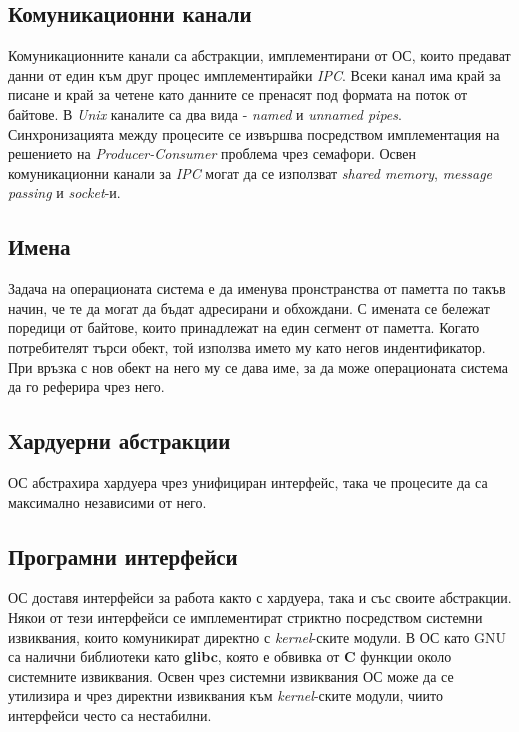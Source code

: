 \documentclass[fleqn,12pt]{article}
\begin{document}
\subsection{Комуникационни канали}

Комуникационните канали са абстракции, имплементирани от ОС, които предават данни от един към друг процес имплементирайки \textit{IPC}.
Всеки канал има край за писане и край за четене като данните се пренасят под формата на поток от байтове.
В \textit{Unix} каналите са два вида - \textit{named}  и \textit{unnamed pipes}.
Синхронизацията между процесите се извършва посредством имплементация на решението на \textit{Producer-Consumer} проблема чрез семафори.
Освен комуникационни канали за \textit{IPC} могат да се използват \textit{shared memory}, \textit{message passing} и \textit{socket}-и.

\subsection{Имена}

Задача на операционата система е да именува пронстранства от паметта по такъв начин, че те да могат да бъдат адресирани и обхождани.
С имената се бележат поредици от байтове, които принадлежат на един сегмент от паметта.
Когато потребителят търси обект, той използва името му като негов индентификатор.
При връзка с нов обект на него му се дава име, за да може операционата система да го реферира чрез него.

\subsection{Хардуерни абстракции}

ОС абстрахира хардуера чрез унифициран интерфейс, така че процесите да са максимално независими от него.

\subsection{Програмни интерфейси}

ОС доставя интерфейси за работа както с хардуера, така и със своите абстракции.
Някои от тези интерфейси се имплементират стриктно посредством системни извиквания, които комуникират директно с \textit{kernel}-ските модули.
В ОС като GNU са налични библиотеки като \textbf{glibc}, която е обвивка от \textbf{C} функции около системните извиквания.
Освен чрез системни извиквания ОС може да се утилизира и чрез директни извиквания към \textit{kernel}-ските модули, чиито интерфейси често са нестабилни.
\end{document}
